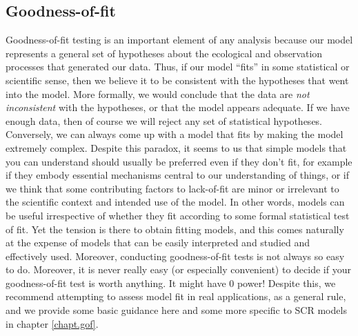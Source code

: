 \subsection{Goodness-of-fit}

Goodness-of-fit testing is an important element of any analysis
because  our model represents a general set of hypotheses
about the ecological and observation processes that generated our
data. Thus, if our model ``fits'' in some statistical or scientific
sense, then we believe it to be consistent with the hypotheses that
went into the model. More formally, we would conclude that the data
are {\it not inconsistent} with the hypotheses, or that the model
appears adequate. If we have enough
data, then of course we will reject any set of statistical hypotheses.
Conversely, we can always come up with a model that fits by making the
model extremely complex. Despite this paradox, it seems to us that
simple models that you can understand should usually be preferred even
if they don't fit, for example if they embody essential mechanisms
central to our understanding of things, or
if we think that some contributing factors to lack-of-fit are minor or
irrelevant to the scientific context and intended use of the model.
In other words, models can be useful irrespective of whether they fit
according to some formal statistical test of fit.  Yet
the tension is there to obtain fitting models, and this comes naturally at
the expense of models that can be easily interpreted and studied and
effectively used. 
Moreover, conducting goodness-of-fit tests is
not always so easy to do. Moreover, it is never really easy (or
especially convenient) to decide if your goodness-of-fit test is worth
anything. It might have 0 power!
Despite this,
we recommend attempting to assess model fit in real applications,
as a general rule, and we provide some basic guidance here and some more
specific to SCR models in
chapter \ref{chapt.gof}. 

